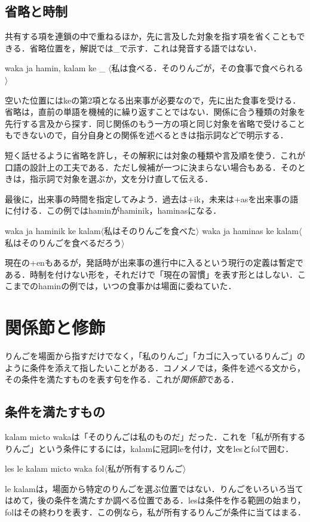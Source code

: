 \documentclass[b5paper, 10pt]{ltjsarticle}
\newcommand{\ko}[1]{\textsf{#1}}
\newcommand{\sentence}[1]{$\langle$#1$\rangle$}
\begin{document}
\subsection{省略と時制}
共有する項を連鎖の中で重ねるほか，先に言及した対象を指す項を省くこともできる．省略位置を，解説では\ko{\_}で示す．これは発音する語ではない．
\begin{exe}
    \ex \ko{waka ja hamin, kalam ke \_}
    \glt \sentence{私は食べる．そのりんごが，その食事で食べられる}
\end{exe}
空いた位置には\ko{ke}の第2項となる出来事が必要なので，先に出た食事を受ける．省略は，直前の単語を機械的に繰り返すことではない．関係に合う種類の対象を先行する言及から探す．同じ関係のもう一方の項と同じ対象を省略で受けることもできないので，自分自身との関係を述べるときは指示詞などで明示する．

短く話せるように省略を許し，その解釈には対象の種類や言及順を使う．これが口語の設計上の工夫である．ただし候補が一つに決まらない場合もある．そのときは，指示詞で対象を選ぶか，文を分け直して伝える．

最後に，出来事の時間を指定してみよう．過去は\ko{+ik}，未来は\ko{+as}を出来事の語に付ける．この例では\ko{hamin}が\ko{haminik}，\ko{haminas}になる．
\begin{exe}
    \ex \ko{waka ja haminik ke kalam}\hfill \sentence{私はそのりんごを食べた}
    \ex \ko{waka ja haminas ke kalam}\hfill \sentence{私はそのりんごを食べるだろう}
\end{exe}
現在の\ko{+en}もあるが，発話時が出来事の進行中に入るという現行の定義は暫定である．時制を付けない形を，それだけで「現在の習慣」を表す形とはしない．ここまでの\ko{hamin}の例では，いつの食事かは場面に委ねていた．

\section{関係節と修飾}
りんごを場面から指すだけでなく，「私のりんご」「カゴに入っているりんご」のように条件を添えて指したいことがある．コノメノでは，条件を述べる文から，その条件を満たすものを表す句を作る．これが\emph{関係節}である．

\subsection{条件を満たすもの}
\ko{kalam micto waka}は「そのりんごは私のものだ」だった．これを「私が所有するりんご」という条件にするには，\ko{kalam}に冠詞\ko{le}を付け，文を\ko{les}と\ko{fol}で囲む．
\begin{exe}
    \ex \ko{les le kalam micto waka fol}\hfill \sentence{私が所有するりんご}
\end{exe}
\ko{le kalam}は，場面から特定のりんごを選ぶ位置ではない．りんごをいろいろ当てはめて，後の条件を満たすか調べる位置である．\ko{les}は条件を作る範囲の始まり，\ko{fol}はその終わりを表す．この例なら，私が所有するりんごが条件に当てはまる．
\end{document}
